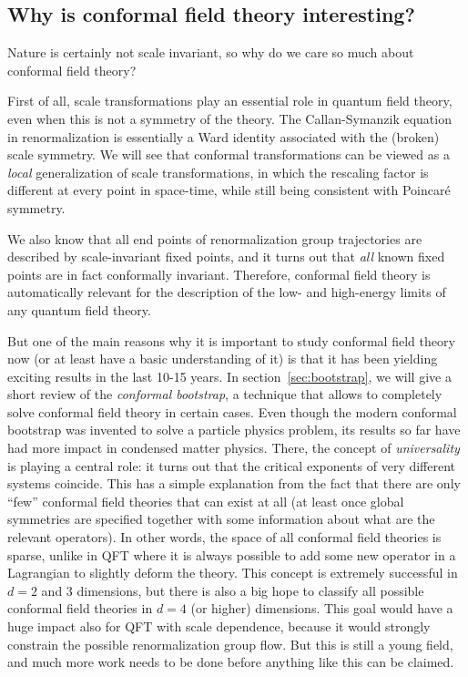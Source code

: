 \documentclass[a4paper,12pt]{article}
\numberwithin{equation}{section}
\begin{document}


\subsection{Why is conformal field theory interesting?}

Nature is certainly not scale invariant, so why do we care so much about conformal field theory?

First of all, scale transformations play an essential role in quantum field theory, even when this is not a symmetry of the theory. The Callan-Symanzik equation in renormalization is essentially a Ward identity associated with the (broken) scale symmetry. 
We will see that conformal transformations can be viewed as a \emph{local} generalization of scale transformations, in which the rescaling factor is different at every point in space-time, while still being consistent with Poincaré symmetry.

We also know that all end points of renormalization group trajectories are described by scale-invariant fixed points, and it turns out that \emph{all} known fixed points are in fact conformally invariant. Therefore, conformal field theory is automatically relevant for the description of the low- and high-energy limits of any quantum field theory.

But one of the main reasons why it is important to study conformal field theory now (or at least have a basic understanding of it) is that it has been yielding exciting results in the last 10-15 years. In section~\ref{sec:bootstrap}, we will give a short review of the  \emph{conformal bootstrap}, a technique that allows to completely solve conformal field theory in certain cases.
Even though the modern conformal bootstrap was invented to solve a particle physics problem, its results so far have had more impact in condensed matter physics. There, the concept of \emph{universality} is playing a central role: it turns out that the critical exponents of very different systems coincide. This has a simple explanation from the fact that there are only ``few'' conformal field theories that can exist at all (at least once global symmetries are specified together with some information about what are the relevant operators). In other words, the space of all conformal field theories is sparse, unlike in QFT where it is always possible to add some new operator in a Lagrangian to slightly deform the theory.
This concept is extremely successful in $d = 2$ and 3 dimensions, but there is also a big hope to classify all possible conformal field theories in $d = 4$ (or higher) dimensions. 
This goal would have a huge impact also for QFT with scale dependence, because it would strongly constrain the possible renormalization group flow.
But this is still a young field, and much more work needs to be done before anything like this can be claimed.
\end{document}
